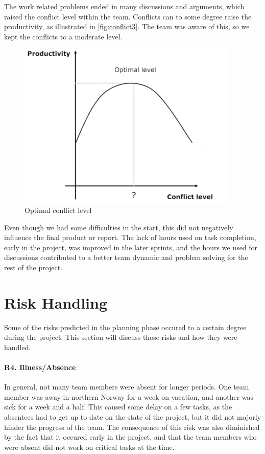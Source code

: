 The work related problems ended in many discussions and arguments, which raised the conflict level within the team. Conflicts can to some degree raise the productivity, as illustrated in \autoref{fig:conflict3}. The team was aware of this, so we kept the conflicts to a moderate level.
\begin{figure}[htb]
	\center
	\includegraphics[width=\textwidth]{./evaluation/img/conflict3}
	\caption{Optimal conflict level \label{fig:conflict}}
\end{figure}

Even though we had some difficulties in the start, this did not negatively influence the final product or report. The lack of hours used on task completion, early in the project, was improved in the later sprints, and the hours we used for discussions contributed to a better team dynamic and problem solving for the rest of the project. 

\section{Risk Handling}
Some of the risks predicted in the planning phase occured to a certain degree during the project.
This section will discuss those risks and how they were handled.

\paragraph{R4. Illness/Absence}
In general, not many team members were absent for longer periods.
One team member was away in northern Norway for a week on vacation, and another was sick for a week and a half. This caused some delay on a few tasks, as the absentees had to get up to date on the state of the project, but it did not majorly hinder the progress of the team. The consequence of this risk was also diminished by the fact that it occured early in the project, and that the team members who were absent did not work on critical tasks at the time.


